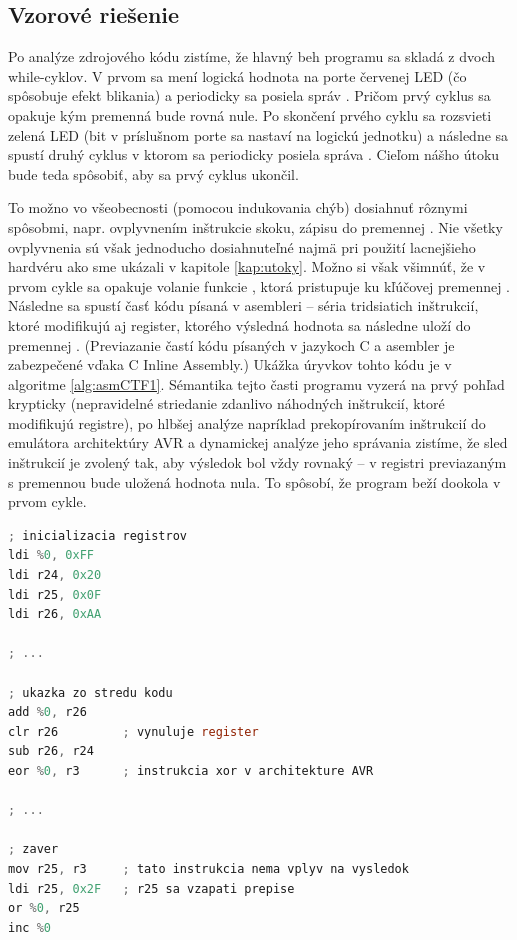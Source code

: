 \subsection{Vzorové riešenie}
Po analýze zdrojového kódu zistíme, že hlavný beh programu sa skladá z dvoch while-cyklov. V prvom sa mení logická hodnota na porte červenej LED (čo spôsobuje efekt blikania) a periodicky sa posiela správ . Pričom prvý cyklus sa opakuje kým premenná  bude rovná nule. Po skončení prvého cyklu sa rozsvieti zelená LED (bit v príslušnom porte sa nastaví na logickú jednotku) a následne sa spustí druhý cyklus v ktorom sa periodicky posiela správa . Cieľom nášho útoku bude teda spôsobiť, aby sa prvý cyklus ukončil.

To možno vo všeobecnosti (pomocou indukovania chýb) dosiahnuť rôznymi spôsobmi, napr. ovplyvnením inštrukcie skoku, zápisu do premennej . Nie všetky ovplyvnenia sú však jednoducho dosiahnuteľné najmä pri použití lacnejšieho hardvéru ako sme ukázali v kapitole \ref{kap:utoky}. Možno si však všimnúť, že v prvom cykle sa opakuje volanie funkcie , ktorá pristupuje ku kľúčovej premennej . Následne sa spustí časť kódu písaná v asembleri -- séria tridsiatich inštrukcií, ktoré modifikujú aj register, ktorého výsledná hodnota sa následne uloží do premennej . (Previazanie častí kódu písaných v jazykoch C a asembler je zabezpečené vďaka C Inline Assembly.) Ukážka úryvkov tohto kódu je v algoritme \ref{alg:asmCTF1}. Sémantika tejto časti programu vyzerá na prvý pohľad krypticky (nepravidelné striedanie zdanlivo náhodných inštrukcií, ktoré modifikujú registre), po hlbšej analýze napríklad prekopírovaním inštrukcií do emulátora architektúry AVR a dynamickej analýze jeho správania zistíme, že sled inštrukcií je zvolený tak, aby výsledok bol vždy rovnaký -- v registri previazaným s premennou  bude uložená hodnota nula. To spôsobí, že program beží dookola v prvom cykle.

\begin{lstlisting}[float,language=C,caption={Ukážky kritickej časti kódu z príkladu 1. \%0 označuje výstupný parameter -- register s výstupnou hodnotou.},label=alg:asmCTF1]
; inicializacia registrov
ldi %0, 0xFF
ldi r24, 0x20
ldi r25, 0x0F
ldi r26, 0xAA

; ...

; ukazka zo stredu kodu
add %0, r26
clr r26         ; vynuluje register
sub r26, r24
eor %0, r3      ; instrukcia xor v architekture AVR

; ...

; zaver
mov r25, r3     ; tato instrukcia nema vplyv na vysledok
ldi r25, 0x2F   ; r25 sa vzapati prepise
or %0, r25
inc %0
\end{lstlisting}

